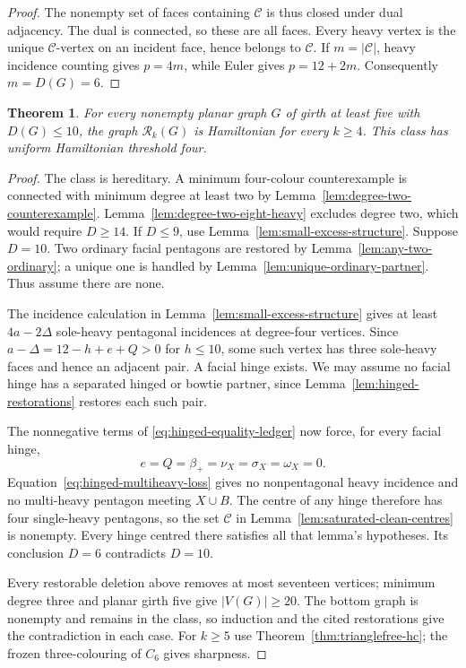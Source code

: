 \documentclass[11pt]{article}
\newtheorem{theorem}{Theorem}[section]
\theoremstyle{remark}
\newcommand{\Rk}{\mathcal R_k}
\numberwithin{equation}{section}
\numberwithin{table}{section}
\begin{document}
\begin{proof}
The nonempty set of faces containing $\mathcal C$ is thus closed
under dual adjacency. The dual is connected, so these are all faces.
Every heavy vertex is the unique $\mathcal C$-vertex on an incident
face, hence belongs to $\mathcal C$. If $m=|\mathcal C|$, heavy
incidence counting gives $p=4m$, while Euler gives $p=12+2m$.
Consequently $m=D(G)=6$.
\end{proof}

\begin{theorem}\label{thm:excess-ten}
For every nonempty planar graph $G$ of girth at least five with
$D(G)\le10$, the graph $\Rk(G)$ is Hamiltonian for every $k\ge4$.
This class has uniform Hamiltonian threshold four.
\end{theorem}
\begin{proof}
The class is hereditary. A minimum four-colour counterexample is
connected with minimum degree at least two by
Lemma~\ref{lem:degree-two-counterexample}.
Lemma~\ref{lem:degree-two-eight-heavy} excludes degree two, which
would require $D\ge14$. If $D\le9$, use
Lemma~\ref{lem:small-excess-structure}. Suppose $D=10$.
Two ordinary facial pentagons are restored by
Lemma~\ref{lem:any-two-ordinary}; a unique one is handled by
Lemma~\ref{lem:unique-ordinary-partner}. Thus assume there are none.

The incidence calculation in Lemma~\ref{lem:small-excess-structure}
gives at least $4a-2\Delta$ sole-heavy pentagonal incidences at
degree-four vertices. Since $a-\Delta=12-h+e+Q>0$ for $h\le10$,
some such vertex has three sole-heavy faces and hence an adjacent
pair. A facial hinge exists. We may assume no facial hinge has a
separated hinged or bowtie partner, since
Lemma~\ref{lem:hinged-restorations} restores each such pair.

The nonnegative terms of \eqref{eq:hinged-equality-ledger} now force,
for every facial hinge,
\[
 e=Q=\beta_+=\nu_X=\sigma_X=\omega_X=0.
\]
Equation~\eqref{eq:hinged-multiheavy-loss} gives no nonpentagonal
heavy incidence and no multi-heavy pentagon meeting $X\cup B$.
The centre of any hinge therefore has four single-heavy pentagons,
so the set $\mathcal C$ in Lemma~\ref{lem:saturated-clean-centres}
is nonempty. Every hinge centred there satisfies all that lemma's
hypotheses. Its conclusion $D=6$ contradicts $D=10$.

Every restorable deletion above removes at most seventeen vertices;
minimum degree three and planar girth five give $|V(G)|\ge20$.
The bottom graph is nonempty and remains in the class, so induction
and the cited restorations give the contradiction in each case.
For $k\ge5$ use Theorem~\ref{thm:trianglefree-hc}; the frozen
three-colouring of $C_6$ gives sharpness.
\end{proof}
\end{document}
